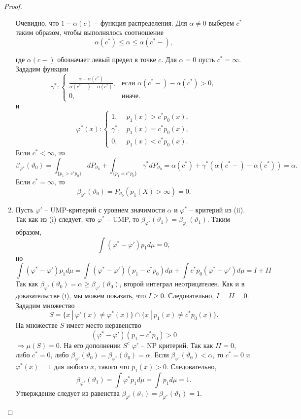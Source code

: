 \begin{proof}
\begin{enumerate}
\begin{center}
\begin{minipage}{0.7\textwidth}
					Очевидно, что $1 - \alpha(c)$ -- функция распределения. Для $\alpha \neq 0$ выберем $c^*$ таким образом, чтобы выполнялось соотношение
					\[ \alpha(c^*) \leq \alpha \leq \alpha(c^*-), \]
				\end{minipage}
			\end{center}
		где $\alpha(c-)$ обозначает левый предел в точке $c$. Для $\alpha = 0$ пусть $c^* = \infty$. Зададим функции
		\[ \gamma^*:
		\left \{
		\begin{array}{cl}
		\frac{\alpha - \alpha(c^*)}{\alpha(c^*-)-\alpha(c^*)}, & \text{если $\alpha(c^*-)-\alpha(c^*) > 0$}, \\
		0, & \text{иначе}.
		\end{array}
		\right.
		\]
		и
		\[ \varphi^*(x):
		\left \{
		\begin{array}{cl}
		1, & p_1(x) > c^* p_0(x), \\
		\gamma^*, & p_1(x) = c^*p_0(x), \\
		0, & p_1(x) < c^* p_0(x).
		\end{array}
		\right.
		\]
		Если $c^* < \infty$, то
		\[ \beta_{\varphi^*}(\vartheta_0) = \int_{\{p_1 > c^* p_0\}}dP_{\vartheta_0} + \int_{\{p_1 = c^* p_0\}}\gamma^* dP_{\vartheta_0} = \alpha(c^*)+\gamma^*(\alpha(c^*-)-\alpha(c^*)) = \alpha. \]
		Если $c^* = \infty$, то
		\[\beta_{\varphi^*}(\vartheta_0) = P_{\vartheta_0}(p_1(X) > \infty) = 0. \]
		\item Пусть $\varphi'$ -- UMP-критерий с уровнем значимости $\alpha$ и $\varphi^*$ -- критерий из (ii). Так как из (i) следует, что $\varphi^*$ -- UMP, то $\beta_{\varphi^*}(\vartheta_1) = \beta_{\varphi_1}(\vartheta_1)$. Таким образом,
		\[ \int (\varphi^* - \varphi')p_1 d\mu = 0, \]
		но
		\[
		\int (\varphi^* - \varphi')p_1 d\mu = \int (\varphi^* - \varphi')(p_1 - c^*p_0)d\mu + \int c^*p_0(\varphi^* - \varphi')d\mu = I+II \]
		Так как $\beta_{\varphi^*}(\vartheta_0)=\alpha \geq \beta_{\varphi'}(\vartheta_0)$, второй интеграл неотрицателен. Как и в доказательстве (i), мы можем показать, что $I \geq 0$. Следовательно, $I = II = 0$. Зададим множество
		\[ S= \{ x\ |\ \varphi'(x) \neq \varphi^*(x) \} \cap \{ x\ |\ p_1(x) \neq c^*p_0(x) \}. \]
		На множестве $S$ имеет место неравенство
		\[ (\varphi^* - \varphi')(p_1 - c^*p_0)>0 \]
		$\Longrightarrow \mu(S) = 0$. На его дополнении $S^c$ $\varphi'$ -- NP критерий. Так как $II = 0$, либо $c^* = 0$, либо $\beta_{\varphi'}(\vartheta_0) = \beta_{\varphi^*}(\vartheta_0) = \alpha$. Если $\beta_{\varphi'}(\vartheta_0) < \alpha$, то $c^* = 0$ и $\varphi^*(x) = 1$ для любого $x$, такого что $p_1(x) > 0$. Следовательно,
		\[\beta_{\varphi^*}(\vartheta_1) = \int \varphi^*p_1 d\mu = \int p_1 d\mu = 1. \]
		Утверждение следует из равенства $\beta_{\varphi'}(\vartheta_1) = \beta_{\varphi^*}(\vartheta_1) = 1$.
	\end{enumerate}
\end{proof}

